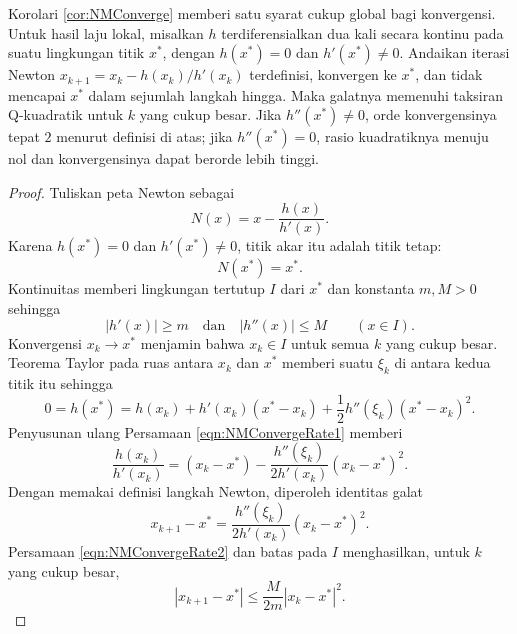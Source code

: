 \begin{theorem} Korolari \ref{cor:NMConverge} memberi satu syarat cukup global bagi konvergensi. Untuk hasil laju lokal, misalkan $h$ terdiferensialkan dua kali secara kontinu pada suatu lingkungan titik $x^*$, dengan $h(x^*)=0$ dan $h'(x^*)\neq0$. Andaikan iterasi Newton
$x_{k+1}=x_k-h(x_k)/h'(x_k)$ terdefinisi, konvergen ke $x^*$, dan tidak mencapai $x^*$ dalam sejumlah langkah hingga. Maka galatnya memenuhi taksiran Q-kuadratik untuk $k$ yang cukup besar. Jika $h''(x^*)\neq0$, orde konvergensinya tepat $2$ menurut definisi di atas; jika $h''(x^*)=0$, rasio kuadratiknya menuju nol dan konvergensinya dapat berorde lebih tinggi.
\label{thm:NMConvergeRate}
\end{theorem}
\begin{proof} Tuliskan peta Newton sebagai
\begin{equation}
N(x)=x-\frac{h(x)}{h'(x)}.
\end{equation}
Karena $h(x^*)=0$ dan $h'(x^*)\neq0$, titik akar itu adalah titik tetap:
\begin{equation}
N(x^*)=x^*.
\end{equation}
Kontinuitas memberi lingkungan tertutup $I$ dari $x^*$ dan konstanta $m,M>0$ sehingga
\begin{equation}
|h'(x)|\geq m\quad\text{dan}\quad |h''(x)|\leq M
\qquad(x\in I).
\end{equation}
Konvergensi $x_k\to x^*$ menjamin bahwa $x_k\in I$ untuk semua $k$ yang cukup besar. Teorema Taylor pada ruas antara $x_k$ dan $x^*$ memberi suatu $\xi_k$ di antara kedua titik itu sehingga
\begin{equation}
0=h(x^*)=h(x_k)+h'(x_k)(x^*-x_k)+\frac12h''(\xi_k)(x^*-x_k)^2.
\label{eqn:NMConvergeRate1}
\end{equation}
Penyusunan ulang Persamaan \ref{eqn:NMConvergeRate1} memberi
\begin{equation}
\frac{h(x_k)}{h'(x_k)}=(x_k-x^*)-
\frac{h''(\xi_k)}{2h'(x_k)}(x_k-x^*)^2.
\end{equation}
Dengan memakai definisi langkah Newton, diperoleh identitas galat
\begin{equation}
x_{k+1}-x^*=\frac{h''(\xi_k)}{2h'(x_k)}(x_k-x^*)^2.
\label{eqn:NMConvergeRate2}
\end{equation}
Persamaan \ref{eqn:NMConvergeRate2} dan batas pada $I$ menghasilkan, untuk $k$ yang cukup besar,
\begin{equation}
|x_{k+1}-x^*|\leq\frac{M}{2m}|x_k-x^*|^2.
\label{eqn:NMConvergeRate3}
\end{equation}

\end{proof}
